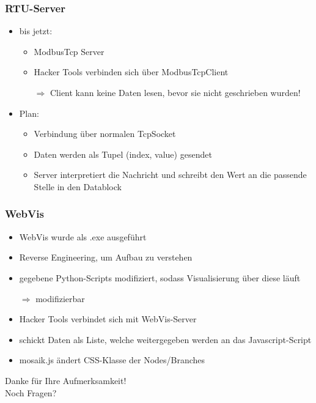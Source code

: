 \documentclass{beamer}
\begin{document}
\begin{frame}
	\frametitle{RTU-Server}
	\begin{itemize}
		\item bis jetzt:
		  \begin{itemize}
		  	\item ModbusTcp Server
		  	\item Hacker Tools verbinden sich über ModbusTcpClient
		  	\item[$\Rightarrow$] Client kann keine Daten lesen, bevor sie nicht geschrieben wurden!
		  \end{itemize}
		\pause
		\item Plan:
			\begin{itemize}
				\item Verbindung über normalen TcpSocket
				\item Daten werden als Tupel (index, value) gesendet
				\item Server interpretiert die Nachricht und schreibt den Wert an die passende Stelle in den Datablock
			\end{itemize}
	\end{itemize}
\end{frame}

\begin{frame}
	\frametitle{WebVis}
	\begin{itemize}
		\item WebVis wurde als .exe ausgeführt
		\item Reverse Engineering, um Aufbau zu verstehen
		\item gegebene Python-Scripts modifiziert, sodass Visualisierung über diese läuft
		\item[$\Rightarrow$] modifizierbar
		\pause
		\item Hacker Tools verbindet sich mit WebVis-Server
		\item schickt Daten als Liste, welche weitergegeben werden an das Javascript-Script
		\item mosaik.js ändert CSS-Klasse der Nodes/Branches
	\end{itemize}
\end{frame}

\begin{frame}
	\centering
	Danke für Ihre Aufmerksamkeit! \\
	Noch Fragen?
\end{frame}
\end{document}
